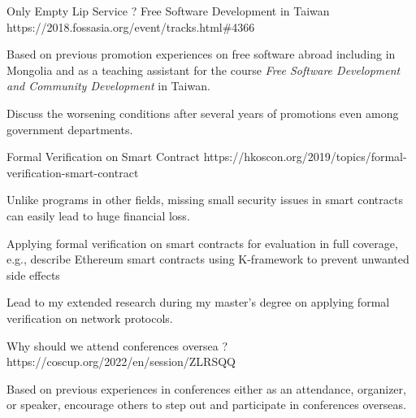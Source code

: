 \begin{cventries}
          \cventry
          {} %
          {Only Empty Lip Service ? Free Software Development in Taiwan} %
          {} %
          {https://2018.fossasia.org\linebreak/event/tracks.html\#4366} %
          {
            \vspace{-2mm}
            \begin{cvitems} %
              \item {Based on previous promotion experiences on free software abroad including in Mongolia and as a teaching assistant for the course \emph{Free Software Development and Community Development} in Taiwan.}
              \item {Discuss the worsening conditions after several years of promotions even among government departments.}
            \end{cvitems}
          }

          \vspace{-3mm}

          \cventry
          {} %
          {Formal Verification on Smart Contract} %
          {} %
          {https://hkoscon.org/2019/topics/formal\linebreak-verification-smart-contract} %
          {
            \vspace{-2mm}
            \begin{cvitems} %
              \item {Unlike programs in other fields, missing small security issues in smart contracts can easily lead to huge financial loss.}
              \item {Applying formal verification on smart contracts for evaluation in full coverage, e.g., describe Ethereum smart contracts using K-framework to prevent unwanted side effects}
              \item {Lead to my extended research during my master's degree on applying formal verification on network protocols.}
            \end{cvitems}
          }

          \cventry
            {} %
            {Why should we attend conferences oversea ?} %
            {} %
            {https://coscup.org/2022\linebreak/en/session/ZLRSQQ} %
            {
              \vspace{-2mm}
              \begin{cvitems} %
                \item {Based on previous experiences in conferences either as an attendance, organizer, or speaker, encourage others to step out and participate in conferences overseas.}
              \end{cvitems}
            }


\end{cventries}
